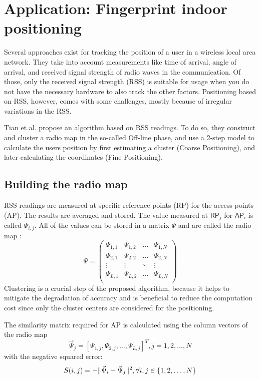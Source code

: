 \documentclass[11pt,a4paper]{article}
\DeclarePairedDelimiter\norm{\lVert}{\rVert}
\begin{document}
\section{Application: Fingerprint indoor positioning}
Several approaches exist for tracking the position of a user in a wireless local area network. They take into account measurements like time of arrival, angle of arrival, and received signal strength of radio waves in the communication. Of those, only the received signal strength (RSS) is suitable for usage when you do not have the necessary hardware to also track the other factors. Positioning based on RSS, however, comes with some challenges, mostly because of irregular variations in the RSS. \cite{tian2013fingerprint}

Tian et al. propose an algorithm based on RSS readings. To do so, they construct and cluster a radio map in the so-called Off-line phase, and use a 2-step model to calculate the users position by first estimating a cluster (Coarse Positioning), and later calculating the coordinates (Fine Positioning). \cite{tian2013fingerprint}
\subsection{Building the radio map}
RSS readings are measured at specific reference points (RP) for the access points (AP). The results are averaged and stored. The value measured at $\mathsf{RP}_j$ for $\mathsf{AP}_i$ is called $\Psi_{i,j}$. All of the values can be stored in a matrix $\Psi$ and are called the radio map \cite{tian2013fingerprint}:
\[\Psi = 
\left( \begin{array}{cccc}
\Psi_{1,1} & \Psi_{1,2} & \dots & \Psi_{1,N} \\                                              
\Psi_{2,1} & \Psi_{2,2} & \dots & \Psi_{2,N} \\
\vdots & \vdots & \ddots & \vdots \\
\Psi_{L,1} & \Psi_{L,2} & \dots & \Psi_{L,N} \\                                        
\end{array}\right)
\]
Clustering is a crucial step of the proposed algorithm, because it helps to mitigate the degradation of accuracy and is beneficial to reduce the computation cost since only the cluster centers are considered for the positioning. \cite{tian2013fingerprint}

The similarity matrix required for AP is calculated using the column vectors of the radio map
\[
\vec{\Psi}_j = \left[\Psi_{1,j}, \Psi_{2,j}, \dots , \Psi_{L,j}\right]^T, j=1,2,\dots , N
\]
with the negative squared error:
\[
S(i,j) = -\norm{\vec{\Psi}_i - \vec{\Psi}_j}^2, \forall i,j \in \{ 1,2,\dots , N \}
\]
\end{document}
